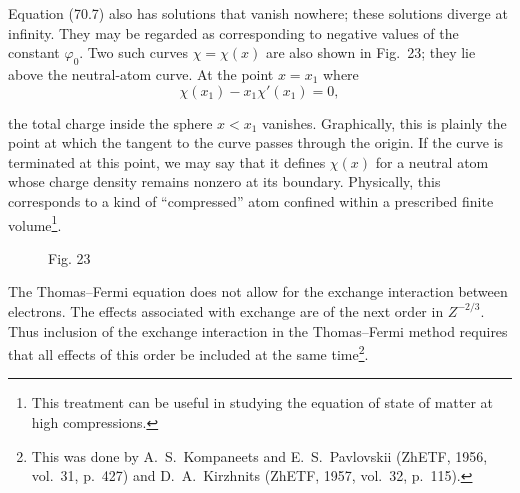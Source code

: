 Equation (70.7) also has solutions that vanish nowhere; these solutions diverge at infinity. They may be regarded as corresponding to negative values of the constant $\varphi_0$. Two such curves $\chi=\chi(x)$ are also shown in Fig.~23; they lie above the neutral-atom curve. At the point $x=x_1$ where
\begin{equation}\chi(x_1)-x_1\chi'(x_1)=0,\tag{70.11}\end{equation}

the total charge inside the sphere $x<x_1$ vanishes. Graphically, this is plainly the point at which the tangent to the curve passes through the origin. If the curve is terminated at this point, we may say that it defines $\chi(x)$ for a neutral atom whose charge density remains nonzero at its boundary. Physically, this corresponds to a kind of ``compressed'' atom confined within a prescribed finite volume\footnote{This treatment can be useful in studying the equation of state of matter at high compressions.}.

\begin{figure}[ht]
\centering
{}
\caption*{Fig. 23}
\end{figure}

The Thomas--Fermi equation does not allow for the exchange interaction between electrons. The effects associated with exchange are of the next order in $Z^{-2/3}$. Thus inclusion of the exchange interaction in the Thomas--Fermi method requires that all effects of this order be included at the same time\footnote{This was done by A.~S.~Kompaneets and E.~S.~Pavlovskii (ZhETF, 1956, vol.~31, p.~427) and D.~A.~Kirzhnits (ZhETF, 1957, vol.~32, p.~115).}.

